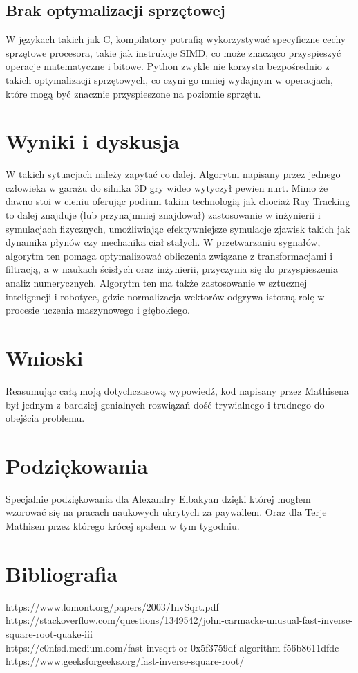 \documentclass[12pt]{article}
\begin{document}
\subsection{Brak optymalizacji sprzętowej}
W językach takich jak C, kompilatory potrafią wykorzystywać specyficzne cechy sprzętowe procesora, takie jak instrukcje SIMD, co może znacząco przyspieszyć operacje matematyczne i bitowe. Python zwykle nie korzysta bezpośrednio z takich optymalizacji sprzętowych, co czyni go mniej wydajnym w operacjach, które mogą być znacznie przyspieszone na poziomie sprzętu. 

\section{Wyniki i dyskusja}
W takich sytuacjach należy zapytać co dalej. Algorytm napisany przez jednego człowieka w garażu do silnika 3D gry wideo wytyczył pewien nurt. Mimo że dawno stoi w cieniu oferując podium takim technologią jak chociaż Ray Tracking to dalej znajduje (lub przynajmniej znajdował) zastosowanie w inżynierii i symulacjach fizycznych, umożliwiając efektywniejsze symulacje zjawisk takich jak dynamika płynów czy mechanika ciał stałych. W przetwarzaniu sygnałów, algorytm ten pomaga optymalizować obliczenia związane z transformacjami i filtracją, a w naukach ścisłych oraz inżynierii, przyczynia się do przyspieszenia analiz numerycznych. Algorytm ten ma także zastosowanie w sztucznej inteligencji i robotyce, gdzie normalizacja wektorów odgrywa istotną rolę w procesie uczenia maszynowego i głębokiego.

\section{Wnioski}
Reasumując całą moją dotychczasową wypowiedź, kod napisany przez Mathisena był jednym z bardziej genialnych rozwiązań dość trywialnego i trudnego do obejścia problemu. 

\section{Podziękowania}
Specjalnie podziękowania dla Alexandry Elbakyan dzięki której mogłem wzorować się na pracach naukowych ukrytych za paywallem. Oraz dla Terje Mathisen przez którego krócej spałem w tym tygodniu.

\section{Bibliografia}
https://www.lomont.org/papers/2003/InvSqrt.pdf
\\https://stackoverflow.com/questions/1349542/john-carmacks-unusual-fast-inverse-square-root-quake-iii
\\https://c0nfsd.medium.com/fast-invsqrt-or-0x5f3759df-algorithm-f56b8611dfdc
\\https://www.geeksforgeeks.org/fast-inverse-square-root/
\end{document}

